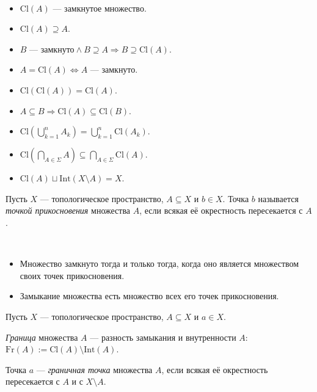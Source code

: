\documentclass[12pt,a4paper]{article}
\newcommand{\Int}{\ensuremath{\mathrm{Int}}\xspace}
\newcommand{\Cl}{\ensuremath{\mathrm{Cl}}\xspace}
\newcommand{\Fr}{\ensuremath{\mathrm{Fr}}\xspace}
\begin{document}
    \begin{theorem}\ 
        \begin{multicols}{2}
            \begin{itemize}
                \item $\Cl(A)$ --- замкнутое множество.
                \item $\Cl(A) \supseteq A$.
                \item $B\text{ --- замкнуто} \wedge B \supseteq A \Rightarrow B \supseteq \Cl(A)$.
                \item $A = \Cl(A) \Leftrightarrow A \text{ --- замкнуто}$.
                \item $\Cl(\Cl(A)) = \Cl(A)$.
                \item $A \subseteq B \Rightarrow \Cl(A) \subseteq \Cl(B)$.
                \item $\Cl(\bigcup_{k=1}^n A_k) = \bigcup_{k=1}^n \Cl(A_k)$.
                \item $\Cl(\bigcap_{A \in \Sigma} A) \subseteq \bigcap_{A \in \Sigma} \Cl(A)$.
                \item $\Cl(A) \sqcup \Int(X \setminus A) = X$.
            \end{itemize}
        \end{multicols}
    \end{theorem}

    \begin{definition}
        Пусть $X$ --- топологическое пространство, $A \subseteq X$ и $b \in X$. Точка $b$ называется \emph{точкой прикосновения} множества $A$, если всякая её окрестность пересекается с $A$.
    \end{definition}

    \begin{theorem}\ 
        \begin{itemize}
            \item Множество замкнуто тогда и только тогда, когда оно является множеством своих точек прикосновения.
            \item Замыкание множества есть множество всех его точек прикосновения.
        \end{itemize}
    \end{theorem}

    \begin{definition}
        Пусть $X$ --- топологическое пространство, $A \subseteq X$ и $a \in X$.

        \emph{Граница} множества $A$ --- разность замыкания и внутренности $A$: $\Fr(A) := \Cl(A) \setminus \Int(A)$.

        Точка $a$ --- \emph{граничная точка} множества $A$, если всякая её окрестность пересекается с $A$ и с $X \setminus A$.
    \end{definition}
\end{document}
